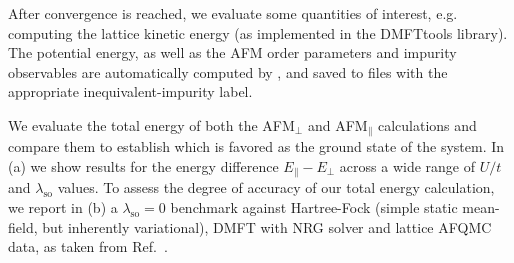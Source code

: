 \documentclass[edipack_sp.tex]{subfiles}
\begin{document}
After convergence is reached, we evaluate some quantities of interest, e.g. computing the 
lattice kinetic energy (as implemented in the {DMFTtools} 
library). The potential energy, as well as the AFM order parameters
and impurity observables are automatically computed by \NAME, 
and saved to files with the appropriate inequivalent-impurity label.

We evaluate the total energy of both the AFM$_\perp$
and AFM$_\parallel$ calculations and compare them to establish which  is favored as the ground state of the system. In (a)
we show results for the energy difference $E_\parallel-E_\perp$ across a wide range of $U/t$ and $\lambda_\mathrm{so}$ values. To assess the
degree of accuracy of our total energy calculation, we report in
(b) a $\lambda_\mathrm{so}=0$ benchmark against
Hartree-Fock (simple static mean-field, but inherently variational), 
DMFT with NRG solver and lattice AFQMC data, as taken from 
Ref.~\cite{Raczkowski2020PRB}. 
\end{document}
